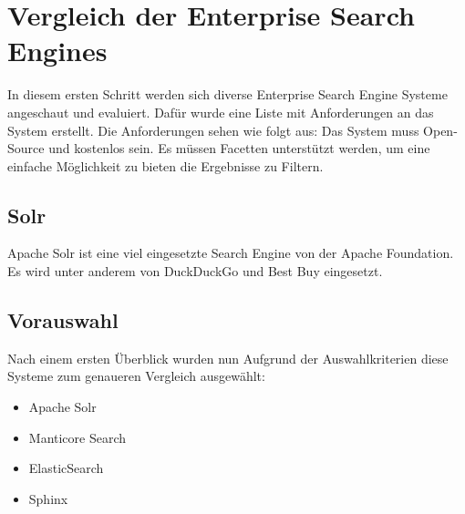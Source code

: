 \chapter{Vergleich der Enterprise Search Engines}

In diesem ersten Schritt werden sich diverse Enterprise Search Engine Systeme angeschaut und evaluiert. Dafür wurde eine Liste mit Anforderungen an das System erstellt. Die Anforderungen sehen wie folgt aus:
Das System muss Open-Source und kostenlos sein. Es müssen Facetten unterstützt werden, um eine einfache Möglichkeit zu bieten die Ergebnisse zu Filtern.

\section{Solr}

Apache Solr ist eine viel eingesetzte Search Engine von der Apache Foundation. Es wird unter anderem von DuckDuckGo und Best Buy eingesetzt. \cite{TheApacheSoftwareFoundation.2019}


\section {Vorauswahl}

Nach einem ersten Überblick wurden nun Aufgrund der Auswahlkriterien diese Systeme zum genaueren Vergleich ausgewählt:

\begin{itemize}
    \item Apache Solr
    \item Manticore Search
    \item ElasticSearch
    \item Sphinx
\end{itemize}

